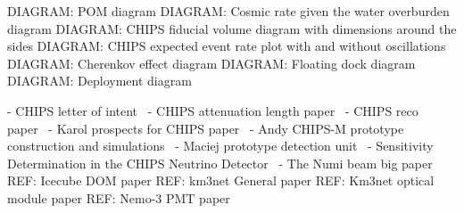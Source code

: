 DIAGRAM: POM diagram
DIAGRAM: Cosmic rate given the water overburden diagram
DIAGRAM: CHIPS fiducial volume diagram with dimensions around the sides
DIAGRAM: CHIPS expected event rate plot with and without oscillations
DIAGRAM: Cherenkov effect diagram
DIAGRAM: Floating dock diagram
DIAGRAM: Deployment diagram

- CHIPS letter of intent~\cite{adamson2013}
- CHIPS attenuation length paper~\cite{amat2017}
- CHIPS reco paper~\cite{blake2016}
- Karol prospects for CHIPS paper~\cite{lang2015}
- Andy CHIPS-M prototype construction and simulations~\cite{perch2015}
- Maciej prototype detection unit~\cite{pfutznerProto2017}
- Sensitivity Determination in the CHIPS Neutrino Detector~\cite{adde2016}
- The Numi beam big paper~\cite{adamson2016}
REF: Icecube DOM paper
REF: km3net General paper
REF: Km3net optical module paper
REF: Nemo-3 PMT paper